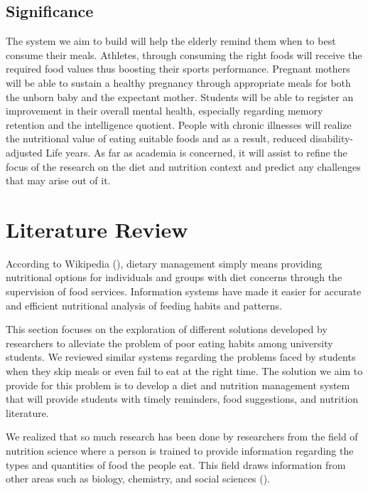 \documentclass{article}
\begin{document}
\subsection{Significance}
The system we aim to build will help the elderly remind them when to best consume their meals. Athletes, through consuming the right foods will receive the required food values thus boosting their sports performance. Pregnant mothers will be able to sustain a healthy pregnancy through appropriate meals for both the unborn baby and the expectant mother. Students will be able to register an improvement in their overall mental health, especially regarding memory retention and the intelligence quotient.  People with chronic illnesses will realize the nutritional value of eating suitable foods and as a result, reduced disability-adjusted Life years. As far as academia is concerned, it will assist to refine the focus of the research on the diet and nutrition context and predict any challenges that may arise out of it.


\section{Literature Review}

According to Wikipedia (\citeyear{wikipedia2019dietary}), dietary management simply means providing nutritional options for individuals and groups with diet concerns through the supervision of food services. Information systems have made it easier for accurate and efficient nutritional analysis of feeding habits and patterns.

This section focuses on the exploration of different solutions developed by researchers to alleviate the problem of poor eating habits among university students. We reviewed similar systems regarding the problems faced by students when they skip meals or even fail to eat at the right time. The solution we aim to provide for this problem is to develop a diet and nutrition management system that will provide students with timely reminders, food suggestions, and nutrition literature.

We realized that so much research has been done by researchers from the field of nutrition science where a person is trained to provide information regarding the types and quantities of food the people eat. This field draws information from other areas such as biology, chemistry, and social sciences (\cite{sriram2020hire}).
\end{document}
